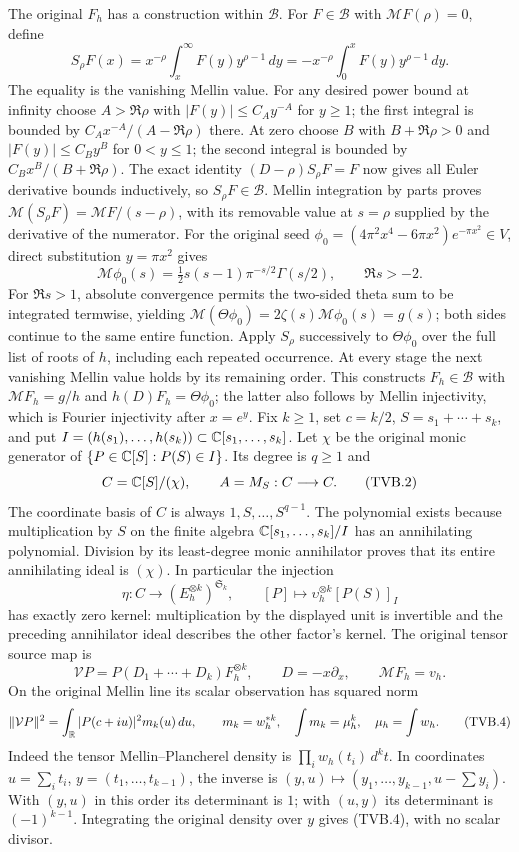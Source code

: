 The original $F_h$ has a construction within $\mathscr B$.
For $F\in\mathscr B$ with $\mathcal MF(\rho)=0$, define
\[
 S_\rho F(x)=x^{-\rho}\int_x^\infty F(y)y^{\rho-1}\,dy
           =-x^{-\rho}\int_0^x F(y)y^{\rho-1}\,dy.
\]
The equality is the vanishing Mellin value. For any desired
power bound at infinity choose $A>\Re\rho$ with
$|F(y)|\le C_Ay^{-A}$ for $y\ge1$; the first integral is bounded
by $C_Ax^{-A}/(A-\Re\rho)$ there. At zero choose $B$ with
$B+\Re\rho>0$ and $|F(y)|\le C_By^B$ for $0<y\le1$;
the second integral is bounded by $C_Bx^B/(B+\Re\rho)$.
The exact identity $(D-\rho)S_\rho F=F$ now gives all Euler
derivative bounds inductively, so $S_\rho F\in\mathscr B$.
Mellin integration by parts proves
$\mathcal M(S_\rho F)=\mathcal MF/(s-\rho)$, with its removable
value at $s=\rho$ supplied by the derivative of the numerator.
For the original seed
$\phi_0=(4\pi^2x^4-6\pi x^2)e^{-\pi x^2}\in V$,
direct substitution $y=\pi x^2$ gives
\[
 \mathcal M\phi_0(s)=\tfrac12s(s-1)\pi^{-s/2}\Gamma(s/2),
 \qquad \Re s>-2.
\]
For $\Re s>1$, absolute convergence permits the two-sided theta
sum to be integrated termwise, yielding
$\mathcal M(\Theta\phi_0)=2\zeta(s)\mathcal M\phi_0(s)=g(s)$;
both sides continue to the same entire function. Apply $S_\rho$
successively to $\Theta\phi_0$ over the full list of roots of $h$,
including each repeated occurrence. At every stage the next
vanishing Mellin value holds by its remaining order. This constructs
$F_h\in\mathscr B$ with $\mathcal MF_h=g/h$ and
$h(D)F_h=\Theta\phi_0$; the latter also follows by Mellin
injectivity, which is Fourier injectivity after $x=e^y$.
Fix $k\ge1$, set $c=k/2$, $S=s_1+\cdots+s_k$, and put
$I=(h(s_1),\ldots,h(s_k))\subset\mathbb C[s_1,\ldots,s_k]$.
Let $\chi$ be the original monic generator of
$\{P\in\mathbb C[S]:P(S)\in I\}$. Its degree is $q\ge1$ and
\[
 C=\mathbb C[S]/(\chi),\qquad A=M_S:C\longrightarrow C.
 \tag{TVB.2}
\]
The coordinate basis of $C$ is always $1,S,\ldots,S^{q-1}$.
The polynomial exists because multiplication by $S$ on the finite
algebra $\mathbb C[s_1,\ldots,s_k]/I$ has an annihilating polynomial.
Division by its least-degree monic annihilator proves that its entire
annihilating ideal is $(\chi)$. In particular the injection
\[
 \eta:C\longrightarrow(E_h^{\otimes k})^{\mathfrak S_k},\qquad
 [P]\longmapsto\upsilon_h^{\otimes k}[P(S)]_I
 \tag{TVB.3}
\]
has exactly zero kernel: multiplication by the displayed unit is
invertible and the preceding annihilator ideal describes the other
factor's kernel. The original tensor source map is
\[
 \mathcal V P=P(D_1+\cdots+D_k)F_h^{\otimes k},\qquad
 D=-x\partial_x,\qquad \mathcal MF_h=v_h.
\]
On the original Mellin line its scalar observation has squared norm
\[
 \|\mathcal VP\|^2=\int_\mathbb R |P(c+iu)|^2m_k(u)\,du,
 \qquad m_k=w_h^{*k},\quad
 \int m_k=\mu_h^k,\quad\mu_h=\int w_h.
 \tag{TVB.4}
\]
Indeed the tensor Mellin--Plancherel density is
$\prod_iw_h(t_i)\,d^kt$. In coordinates
$u=\sum_i t_i$, $y=(t_1,\ldots,t_{k-1})$, the inverse is
$(y,u)\mapsto(y_1,\ldots,y_{k-1},u-\sum y_i)$.
With $(y,u)$ in this order its determinant is $1$; with $(u,y)$
its determinant is $(-1)^{k-1}$. Integrating the original density
over $y$ gives (TVB.4), with no scalar divisor.

